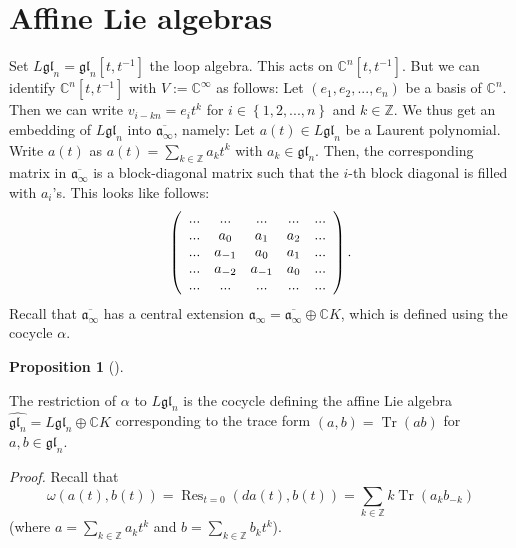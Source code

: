 \documentclass
[numbers=enddot,12pt,final,onecolumn,german,notitlepage]{scrartcl}%
\theoremstyle{definition}
\newtheorem{prop}[theo]{Proposition}
\newenvironment{proposition}[1][]
{\begin{prop}[#1]\begin{leftbar}}
{\end{leftbar}\end{prop}}
\begin{document}
\section{Affine Lie algebras}

Set $L\mathfrak{gl}_{n}=\mathfrak{gl}_{n}\left[  t,t^{-1}\right]  $ the loop
algebra. This acts on $\mathbb{C}^{n}\left[  t,t^{-1}\right]  $. But we can
identify $\mathbb{C}^{n}\left[  t,t^{-1}\right]  $ with $V:=\mathbb{C}%
^{\infty}$ as follows: Let $\left(  e_{1},e_{2},...,e_{n}\right)  $ be a basis
of $\mathbb{C}^{n}$. Then we can write $v_{i-kn}=e_{i}t^{k}$ for $i\in\left\{
1,2,...,n\right\}  $ and $k\in\mathbb{Z}$. We thus get an embedding of
$L\mathfrak{gl}_{n}$ into $\overline{\mathfrak{a}_{\infty}}$, namely: Let
$a\left(  t\right)  \in L\mathfrak{gl}_{n}$ be a Laurent polynomial. Write
$a\left(  t\right)  $ as $a\left(  t\right)  =\sum\limits_{k\in\mathbb{Z}%
}a_{k}t^{k}$ with $a_{k}\in\mathfrak{gl}_{n}$. Then, the corresponding matrix
in $\overline{\mathfrak{a}_{\infty}}$ is a block-diagonal matrix such that the
$i$-th block diagonal is filled with $a_{i}$'s. This looks like follows:%
\[
\left(
\begin{array}
[c]{ccccc}%
... & ... & ... & ... & ...\\
... & a_{0} & a_{1} & a_{2} & ...\\
... & a_{-1} & a_{0} & a_{1} & ...\\
... & a_{-2} & a_{-1} & a_{0} & ...\\
... & ... & ... & ... & ...
\end{array}
\right)  .
\]
Recall that $\overline{\mathfrak{a}_{\infty}}$ has a central extension
$\mathfrak{a}_{\infty}=\overline{\mathfrak{a}_{\infty}}\oplus\mathbb{C}K$,
which is defined using the cocycle $\alpha$.

\begin{proposition}
The restriction of $\alpha$ to $L\mathfrak{gl}_{n}$ is the cocycle defining
the affine Lie algebra $\widehat{\mathfrak{gl}_{n}}=L\mathfrak{gl}_{n}%
\oplus\mathbb{C}K$ corresponding to the trace form $\left(  a,b\right)
=\operatorname*{Tr}\left(  ab\right)  $ for $a,b\in\mathfrak{gl}_{n}$.
\end{proposition}

\textit{Proof.} Recall that%
\[
\omega\left(  a\left(  t\right)  ,b\left(  t\right)  \right)
=\operatorname*{Res}\nolimits_{t=0}\left(  da\left(  t\right)  ,b\left(
t\right)  \right)  =\sum\limits_{k\in\mathbb{Z}}k\operatorname*{Tr}\left(
a_{k}b_{-k}\right)
\]
(where $a=\sum\limits_{k\in\mathbb{Z}}a_{k}t^{k}$ and $b=\sum\limits_{k\in
\mathbb{Z}}b_{k}t^{k}$).
\end{document}
